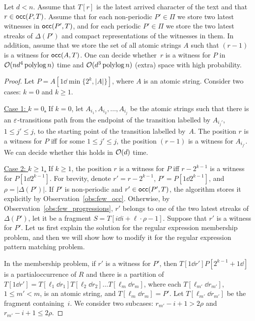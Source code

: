 \begin{lemma}\label{lm:restore_witnesses}
Let $d<n$. Assume that $T[r]$ is the latest arrived character of the text and  that $r \in \mathsf{occ}(P,T)$. Assume that for each non-periodic $P'\in \Pi$ we store two latest witnesses in $\mathsf{occ}(P',T)$, and for each periodic $P' \in \Pi$ we store the two latest streaks of $\Delta(P')$ and compact representations of the witnesses in them. In addition, assume that we store the set of all atomic strings $A$ such that $(r-1)$ is a witness for $\mathsf{occ}(A,T)$. One can decide whether~$r$ is a witness for $P$ in $\mathcal{O}(nd^4 \operatorname{polylog} n)$ time and $\mathcal{O}(d^3\operatorname{polylog} n)$ (extra) space with high probability.
\end{lemma} 
\begin{proof}
Let $P = A[1 \dd \min\{2^k,|A|\}]$, where $A$ is an atomic string. Consider two cases: $k = 0$ and $k \ge 1$.

\underline{Case 1: $k = 0$.} If $k = 0$, let  $A_{i_1}, A_{i_2}, \ldots, A_{i_j}$ be the atomic strings such that there is an $\varepsilon$-transitions path from the endpoint of the transition labelled by $A_{i_j'}$, $1 \le j' \le j$, to the starting point of the transition labelled by~$A$. The position $r$ is a witness for $P$ iff for some $1 \le j' \le j$, the position $(r-1)$ is a witness for $A_{i_{j'}}$. We can decide whether this holds in $\mathcal{O}(d)$ time.

\underline{Case 2: $k \ge 1$.} If $k \ge 1$, the position $r$ is a witness for $P$ iff $r-2^{k-1}$ is a witness for $P[1\dd 2^{k-1}]$. For brevity, denote $r' = r-2^{k-1}$, $P' = P[1\dd 2^{k-1}]$, and $\rho = |\Delta(P')|$. If $P'$ is non-periodic and $r' \in \mathsf{occ}(P',T)$, the algorithm stores it explicitly by Observation~\ref{obs:few_occ}.
Otherwise, by Observation~\ref{obs:few_progressions}, $r'$ belongs to one of the two latest streaks of $\Delta(P')$, let it be a fragment $S = T[i \dd i+ \ell \cdot \rho-1]$. Suppose that $r'$ is a witness for $P'$. Let us first explain the solution for the regular expression membership problem, and then we will show how to modify it for the regular expression pattern matching problem. 

In the membership problem, if $r'$ is a witness for $P'$, then $T[1\dd r'] P[2^{k-1}+1\dd]$ is a partial\sloppy occurrence of $R$ and there is a partition of $T[1 \dd r'] = T[\ell_1 \dd r_1] T[\ell_2 \dd r_2] \ldots T[\ell_m \dd r_m]$, where each $T[\ell_{m'} \dd r_{m'}]$, $1 \le m' < m$, is an atomic string, and $T[\ell_m \dd r_m] = P'$. Let $T[\ell_{m'} \dd r_{m'}]$ be the fragment containing~$i$. We consider two subcases: $r_{m'}-i+1 > 2\rho$ and $r_{m'}-i+1 \le 2\rho$. 


\end{proof}

